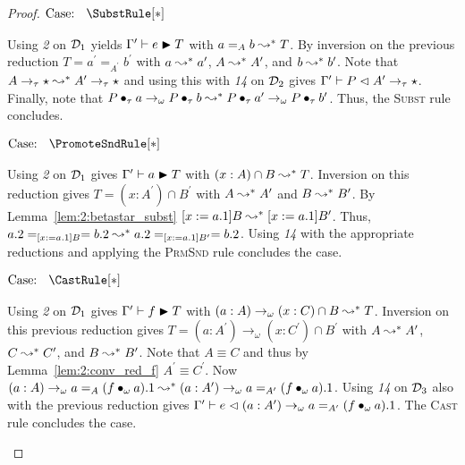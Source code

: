 \begin{proof}
    $\text{Case: }\begin{array}{c} \SubstRule[*] \end{array}$
    \begin{proofcase}
        Using \textit{2} on $\mathcal{D}_{1}$ yields $\Gamma^\prime \vdash e \blacktriangleright T$ with $a =_A b \leadsto^* T$.
        By inversion on the previous reduction $T = a^\prime =_{A^\prime} b^\prime$ with $a \leadsto^* a^\prime$, $A \leadsto^* A^\prime$, and $b \leadsto^* b^\prime$.
        Note that $A \to_\tau \star \leadsto^* A^\prime \to_\tau \star$ and using this with \textit{14} on $\mathcal{D}_{2}$ gives $\Gamma^\prime \vdash P \vartriangleleft A^\prime \to_\tau \star$.
        Finally, note that $P \bullet_{\tau} a \to_\omega P \bullet_{\tau} b \leadsto^* P \bullet_{\tau} a^\prime \to_\omega P \bullet_{\tau} b^\prime$.
        Thus, the \textsc{Subst} rule concludes.
    \end{proofcase}

    $\text{Case: }\begin{array}{c} \PromoteSndRule[*] \end{array}$
    \begin{proofcase}
        Using \textit{2} on $\mathcal{D}_{1}$ gives $\Gamma^\prime \vdash a \blacktriangleright T$ with $(x : A) \cap B \leadsto^* T$.
        Inversion on this reduction gives $T = (x : A^\prime) \cap B^\prime$ with $A \leadsto^* A^\prime$ and $B \leadsto^* B^\prime$.
        By Lemma~\ref{lem:2:betastar_subst} $[x := a.1]B \leadsto^* [x := a.1]B^\prime$.
        Thus, $a.2 =_{[x := a.1]B} = b.2 \leadsto^* a.2 =_{[x := a.1]B^\prime} = b.2$.
        Using \textit{14} with the appropriate reductions and applying the \textsc{PrmSnd} rule concludes the case.
    \end{proofcase}

    $\text{Case: }\begin{array}{c} \CastRule[*] \end{array}$
    \begin{proofcase}
        Using \textit{2} on $\mathcal{D}_{1}$ gives $\Gamma^\prime \vdash f \blacktriangleright T$ with $(a : A) \to_\omega (x : C) \cap B \leadsto^* T$.
        Inversion on this previous reduction gives $T = (a : A^\prime) \to_\omega (x : C^\prime) \cap B^\prime$ with $A \leadsto^* A^\prime$, $C \leadsto^* C^\prime$, and $B \leadsto^* B^\prime$.
        Note that $A \equiv C$ and thus by Lemma~\ref{lem:2:conv_red_f} $A^\prime \equiv C^\prime$.
        Now $(a : A) \to_\omega a =_A (f \bullet_{\omega} a).1 \leadsto^* (a : A^\prime) \to_\omega a =_{A^\prime} (f \bullet_{\omega} a).1$.
        Using \textit{14} on $\mathcal{D}_{3}$ also with the previous reduction gives $\Gamma^\prime \vdash e \vartriangleleft (a : A^\prime) \to_\omega a =_{A^\prime} (f \bullet_{\omega} a).1$.
        The \textsc{Cast} rule concludes the case.
    \end{proofcase}


\end{proof}

